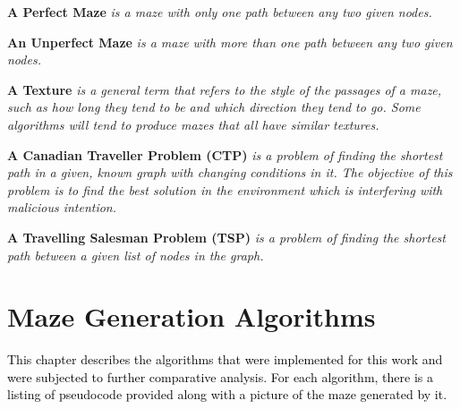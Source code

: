 \begin{definition}\textbf{A Perfect Maze} \emph{is a maze with only one path between any two given nodes.}\end{definition}
\begin{definition}\textbf{An Unperfect Maze} \emph{is a maze with more than one path between any two given nodes.}\end{definition}
 \begin{definition}\textbf{A Texture} \emph{is a general term that refers to the style of the passages of a maze, such as how long they tend to be and which direction they tend to go. Some algorithms will tend to produce mazes that all have similar textures.\cite{15}}\end{definition}
\begin{definition}\textbf{A Canadian Traveller Problem (CTP)} \emph{is a problem of finding the shortest path in a given, known graph with changing conditions in it. The objective of this problem is to find the best solution in the environment which is interfering with malicious intention.}\end{definition}
\begin{definition}\textbf{A Travelling Salesman Problem (TSP)} \emph{is a problem of finding the shortest path between a given list of nodes in the graph.} \end{definition}

\section{Maze Generation Algorithms}
\textcolor{black}{This chapter describes the algorithms that were implemented for this work and were subjected to further comparative analysis. For each algorithm, there is a listing of pseudocode provided along with a picture of the maze generated by it.}
